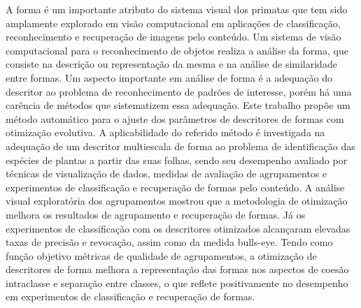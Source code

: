 
A forma é um importante atributo do sistema visual dos primatas que tem sido amplamente explorado em visão computacional em aplicações de classificação, reconhecimento e recuperação de imagens pelo conteúdo. Um sistema de visão computacional para o reconhecimento de objetos realiza 
a análise da forma, que consiste na descrição ou representação da mesma e na análise 
de similaridade entre formas. Um aspecto importante em análise de forma é a adequação
do descritor ao problema de reconhecimento de padrões de interesse, porém há uma carência de métodos que sistematizem essa adequação. Este trabalho propõe um método automático para o ajuste dos parâmetros
de descritores de formas com otimização evolutiva. A aplicabilidade do referido método é investigada na adequação de um descritor multiescala de 
forma ao problema de identificação das espécies de plantas a partir das suas folhas, sendo seu desempenho avaliado por técnicas de visualização de dados, 
medidas de avaliação de agrupamentos e experimentos de classificação e recuperação de formas pelo conteúdo. A análise visual exploratória dos agrupamentos mostrou 
que a metodologia de otimização melhora os resultados de agrupamento e recuperação de formas. Já os experimentos de classificação com os descritores otimizados alcançaram elevadas
taxas de precisão e revocação, assim como da medida bulls-eye. Tendo como função objetivo métricas de qualidade de
agrupamentos, a otimização de descritores de forma melhora a representação das formas nos aspectos de coesão intraclasse e separação entre classes, o que reflete positivamente no desempenho em experimentos de classificação e recuperação de formas.

